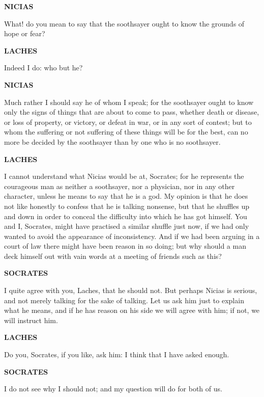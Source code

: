 \documentclass[11pt,letter]{article}
\begin{document}
\par \textbf{NICIAS}
\par   What! do you mean to say that the soothsayer ought to know the grounds of hope or fear?

\par \textbf{LACHES}
\par   Indeed I do:  who but he?

\par \textbf{NICIAS}
\par   Much rather I should say he of whom I speak; for the soothsayer ought to know only the signs of things that are about to come to pass, whether death or disease, or loss of property, or victory, or defeat in war, or in any sort of contest; but to whom the suffering or not suffering of these things will be for the best, can no more be decided by the soothsayer than by one who is no soothsayer.

\par \textbf{LACHES}
\par   I cannot understand what Nicias would be at, Socrates; for he represents the courageous man as neither a soothsayer, nor a physician, nor in any other character, unless he means to say that he is a god. My opinion is that he does not like honestly to confess that he is talking nonsense, but that he shuffles up and down in order to conceal the difficulty into which he has got himself. You and I, Socrates, might have practised a similar shuffle just now, if we had only wanted to avoid the appearance of inconsistency. And if we had been arguing in a court of law there might have been reason in so doing; but why should a man deck himself out with vain words at a meeting of friends such as this?

\par \textbf{SOCRATES}
\par   I quite agree with you, Laches, that he should not. But perhaps Nicias is serious, and not merely talking for the sake of talking. Let us ask him just to explain what he means, and if he has reason on his side we will agree with him; if not, we will instruct him.

\par \textbf{LACHES}
\par   Do you, Socrates, if you like, ask him:  I think that I have asked enough.

\par \textbf{SOCRATES}
\par   I do not see why I should not; and my question will do for both of us.
\end{document}
